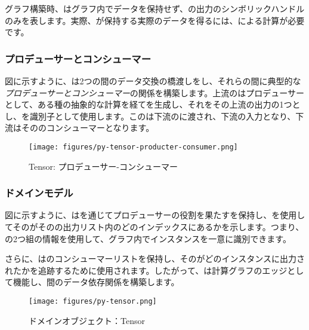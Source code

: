 \begin{content}
グラフ構築時、はグラフ内でデータを保持せず、の出力のシンボリックハンドルのみを表します。実際、が保持する実際のデータを得るには、による計算が必要です。

\subsubsection{プロデューサーとコンシューマー}

図に示すように、は2つの間のデータ交換の橋渡しをし、それらの間に典型的な\emph{プロデューサーとコンシューマー}の関係を構築します。上流のはプロデューサーとして、ある種の抽象的な計算を経てを生成し、それをその上流の出力の1つとし、を識別子として使用します。このは下流のに渡され、下流の入力となり、下流はそののコンシューマーとなります。

\begin{figure}[H]
\centering
\texttt{[image: figures/py-tensor-producter-consumer.png]}
\caption{Tensor: プロデューサー-コンシューマー}
 \label{fig:py-tensor-producter-consumer}
\end{figure}

\subsubsection{ドメインモデル}

図に示すように、はを通じてプロデューサーの役割を果たすを保持し、を使用してそのがそのの出力リスト内のどのインデックスにあるかを示します。つまり、の2つ組の情報を使用して、グラフ内でインスタンスを一意に識別できます。

さらに、はのコンシューマーリストを保持し、そのがどのインスタンスに出力されたかを追跡するために使用されます。したがって、は計算グラフのエッジとして機能し、間のデータ依存関係を構築します。

\begin{figure}[H]
\centering
\texttt{[image: figures/py-tensor.png]}
\caption{ドメインオブジェクト：Tensor}
 \label{fig:py-tensor}
\end{figure}


\end{content}
